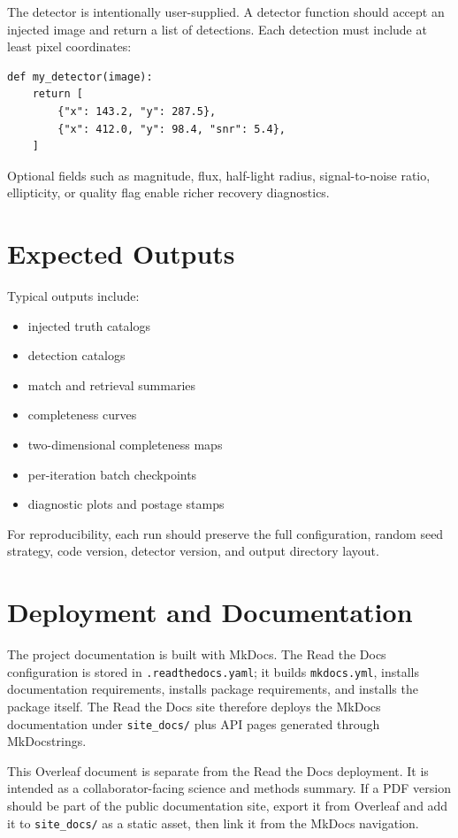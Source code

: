\documentclass[11pt]{article}
\begin{document}
The detector is intentionally user-supplied. A detector function should accept an injected image and return a list of detections. Each detection must include at least pixel coordinates:

\begin{verbatim}
def my_detector(image):
    return [
        {"x": 143.2, "y": 287.5},
        {"x": 412.0, "y": 98.4, "snr": 5.4},
    ]
\end{verbatim}

Optional fields such as magnitude, flux, half-light radius, signal-to-noise ratio, ellipticity, or quality flag enable richer recovery diagnostics.

\section{Expected Outputs}

Typical outputs include:

\begin{itemize}[leftmargin=*]
    \item injected truth catalogs
    \item detection catalogs
    \item match and retrieval summaries
    \item completeness curves
    \item two-dimensional completeness maps
    \item per-iteration batch checkpoints
    \item diagnostic plots and postage stamps
\end{itemize}

For reproducibility, each run should preserve the full configuration, random seed strategy, code version, detector version, and output directory layout.

\section{Deployment and Documentation}

The project documentation is built with MkDocs. The Read the Docs configuration is stored in \texttt{.readthedocs.yaml}; it builds \texttt{mkdocs.yml}, installs documentation requirements, installs package requirements, and installs the package itself. The Read the Docs site therefore deploys the MkDocs documentation under \texttt{site\_docs/} plus API pages generated through MkDocstrings.

This Overleaf document is separate from the Read the Docs deployment. It is intended as a collaborator-facing science and methods summary. If a PDF version should be part of the public documentation site, export it from Overleaf and add it to \texttt{site\_docs/} as a static asset, then link it from the MkDocs navigation.
\end{document}
